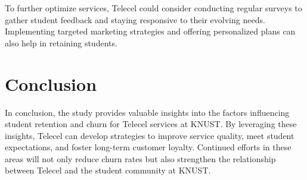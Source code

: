 \documentclass[doublespacing]{report} %
\begin{document}
To further optimize services, Telecel could consider conducting regular surveys to gather student feedback and staying responsive to their evolving needs. Implementing targeted marketing strategies and offering personalized plans can also help in retaining students.

\section{Conclusion}

In conclusion, the study provides valuable insights into the factors influencing student retention and churn for Telecel services at KNUST. By leveraging these insights, Telecel can develop strategies to improve service quality, meet student expectations, and foster long-term customer loyalty. Continued efforts in these areas will not only reduce churn rates but also strengthen the relationship between Telecel and the student community at KNUST.
\end{document}
